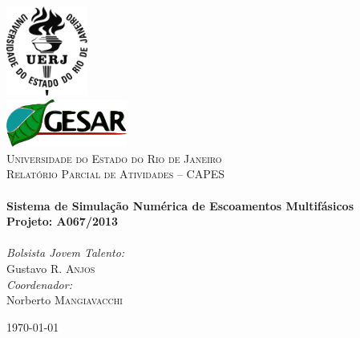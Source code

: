 \typeout{ ====================================================================}
\typeout{ ====================================================================}

\begin{titlepage}
\begin{center}

\includegraphics[width=0.2\textwidth]{./figs/uerj.png}~\\[1cm]
\includegraphics[width=0.3\textwidth]{./figs/gesar.png}~\\[1cm]

\textsc{\LARGE Universidade do Estado do Rio de Janeiro}\\[1.5cm]

\textsc{\Large Relatório Parcial de Atividades -- CAPES}\\[0.5cm]

\HRule \\[0.4cm]
{ \huge \bfseries Sistema de Simulação Numérica de Escoamentos
Multifásicos\\[0.4cm] }
{ \Large \bfseries Projeto: A067/2013\\[0.4cm] }
\HRule \\[1.0cm]

\noindent
\large
\emph{Bolsista Jovem Talento:}\\
Gustavo R. \textsc{Anjos}\\
\vspace{0.3cm}
\emph{Coordenador:}\\
Norberto \textsc{Mangiavacchi}\\
\vfill

{\large \today}

\end{center}
\end{titlepage}


